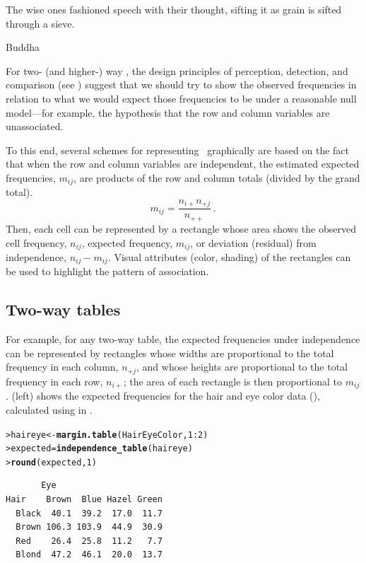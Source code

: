 \documentclass[10pt,krantz2]{krantz}\usepackage[]{graphicx}\usepackage[]{color}
\makeatletter
\newcommand{\hlnum}[1]{\textcolor[rgb]{0.686,0.059,0.569}{#1}}%
\newcommand{\hlopt}[1]{\textcolor[rgb]{0,0,0}{#1}}%
\newcommand{\hlstd}[1]{\textcolor[rgb]{0.345,0.345,0.345}{#1}}%
\newcommand{\hlkwb}[1]{\textcolor[rgb]{0.69,0.353,0.396}{#1}}%
\newcommand{\hlkwd}[1]{\textcolor[rgb]{0.737,0.353,0.396}{\textbf{#1}}}%
\newenvironment{kframe}{%
 \def\at@end@of@kframe{}%
 \ifinner\ifhmode%
  \def\at@end@of@kframe{\end{minipage}}%
  \begin{minipage}{\columnwidth}%
 \fi\fi%
 \def\FrameCommand##1{\hskip\@totalleftmargin \hskip-\fboxsep
 \colorbox{shadecolor}{##1}\hskip-\fboxsep
     \hskip-\linewidth \hskip-\@totalleftmargin \hskip\columnwidth}%
 \MakeFramed {\advance\hsize-\width
   \@totalleftmargin\z@ \linewidth\hsize
   \@setminipage}}%
 {\par\unskip\endMakeFramed%
 \at@end@of@kframe}
\newenvironment{knitrout}{}{} %
\renewenvironment{knitrout}{\small\renewcommand{\baselinestretch}{.85}}{} %
\makeatother
\begin{document}
\epigraph{The wise ones fashioned speech with their thought, sifting it as grain is sifted through a sieve.}{Buddha}
For two- (and higher-) way \ctabs, the
design principles of
perception, detection, and comparison
(see )
suggest that we should try to show the observed frequencies
in relation to what we would expect those frequencies to be
under a reasonable null model---for example, the
hypothesis that the row and column variables are unassociated.

To this end, several schemes for representing \ctabs\
graphically are
based on the fact that when the row and column variables are
independent, the estimated expected frequencies, \(m_{ij}\), are
products of the row and column totals (divided by the grand total).
\begin{equation*}
 m_{ij} = \frac{ n_{i+} n_{+j} } { n_{++} }
 \period
\end{equation*}
Then, each cell can be represented by a rectangle whose area shows
the observed cell frequency, \(n_{ij}\),  expected frequency, \(m_{ij}\),
or deviation (residual) from independence, \(n_{ij} - m_{ij}\).
Visual attributes (color, shading) of the rectangles can be used to
highlight the pattern of association.

\subsection{Two-way tables}\label{sec:twoway-sieve2}

For example, for any two-way table, the expected frequencies under independence
can be represented by rectangles whose widths are proportional to the
total frequency in each column, \(n_{+j}\), and whose heights are
proportional to the total frequency in each row, \(n_{i+}\); the area
of each rectangle is then proportional to \(m_{ij}\).  (left)
shows the expected frequencies for the hair and eye color
data (), calculated using
 in .
\begin{knitrout}
\color{fgcolor}\begin{kframe}
\begin{alltt}
\hlstd{> }\hlstd{haireye} \hlkwb{<-} \hlkwd{margin.table}\hlstd{(HairEyeColor,} \hlnum{1}\hlopt{:}\hlnum{2}\hlstd{)}
\hlstd{> }\hlstd{expected} \hlkwb{=} \hlkwd{independence_table}\hlstd{(haireye)}
\hlstd{> }\hlkwd{round}\hlstd{(expected,} \hlnum{1}\hlstd{)}
\end{alltt}
\begin{verbatim}
       Eye
Hair    Brown  Blue Hazel Green
  Black  40.1  39.2  17.0  11.7
  Brown 106.3 103.9  44.9  30.9
  Red    26.4  25.8  11.2   7.7
  Blond  47.2  46.1  20.0  13.7
\end{verbatim}
\end{kframe}
\end{knitrout}
\end{document}
